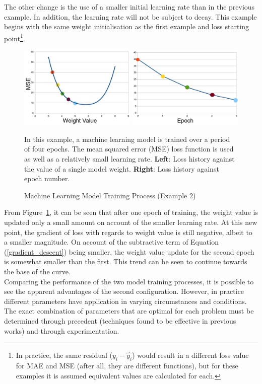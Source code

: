 \noindent
The other change is the use of a smaller initial learning rate than in the previous example.  In addition, the learning rate will not be subject to decay. This example begins with the same weight initialisation as the first example and loss starting point\footnote{In practice, the same residual ($y_i - \hat{y_i}$) would result in a different loss value for MAE and MSE (after all, they are different functions), but for these examples it is assumed equivalent values are calculated for each.}. \\

\begin{figure}[h]
	\centering
	\includegraphics[scale=0.35]{Figures/gradientDescent_mse_smallLR.jpg}
	\caption{Machine Learning Model Training Process (Example 2)} {In this example, a machine learning model is trained over a period of four epochs. The mean squared error (MSE) loss function is used as well as a relatively small learning rate. \textbf{Left}: Loss history against the value of a single model weight.  \textbf{Right}: Loss history against epoch number.}
	\label{fig:GD_mseSmallLR}
\end{figure}

\noindent
From Figure~\ref{fig:GD_mseSmallLR}, it can be seen that after one epoch of training, the weight value is updated only a small amount on account of the smaller learning rate. At this new point, the gradient of loss with regards to weight value is still negative, albeit to a smaller magnitude. On account of the subtractive term of Equation (\ref{gradient_descent}) being smaller, the weight value update for the second epoch is somewhat smaller than the first. This trend can be seen to continue towards the base of the curve. \\

\noindent
Comparing the performance of the two model training processes, it is possible to see the apparent advantages of the second configuration.  However, in practice different parameters have application in varying circumstances and conditions. The exact combination of parameters that are optimal for each problem must be determined through precedent (techniques found to be effective in previous works) and through experimentation.  \\

